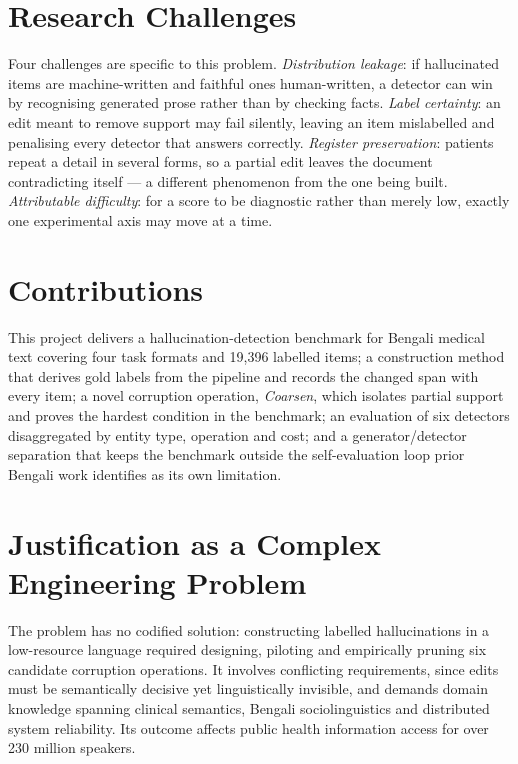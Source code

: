 \documentclass{iutbscthesis}
\begin{document}
\section{Research Challenges}

Four challenges are specific to this problem. \emph{Distribution leakage}: if hallucinated items are machine-written and faithful ones human-written, a detector can win by recognising generated prose rather than by checking facts. \emph{Label certainty}: an edit meant to remove support may fail silently, leaving an item mislabelled and penalising every detector that answers correctly. \emph{Register preservation}: patients repeat a detail in several forms, so a partial edit leaves the document contradicting itself --- a different phenomenon from the one being built. \emph{Attributable difficulty}: for a score to be diagnostic rather than merely low, exactly one experimental axis may move at a time.

\section{Contributions}

This project delivers a hallucination-detection benchmark for Bengali medical text covering four task formats and 19,396 labelled items; a construction method that derives gold labels from the pipeline and records the changed span with every item; a novel corruption operation, \emph{Coarsen}, which isolates partial support and proves the hardest condition in the benchmark; an evaluation of six detectors disaggregated by entity type, operation and cost; and a generator/detector separation that keeps the benchmark outside the self-evaluation loop prior Bengali work identifies as its own limitation.

\section{Justification as a Complex Engineering Problem}

The problem has no codified solution: constructing labelled hallucinations in a low-resource language required designing, piloting and empirically pruning six candidate corruption operations. It involves conflicting requirements, since edits must be semantically decisive yet linguistically invisible, and demands domain knowledge spanning clinical semantics, Bengali sociolinguistics and distributed system reliability. Its outcome affects public health information access for over 230 million speakers.
\end{document}
